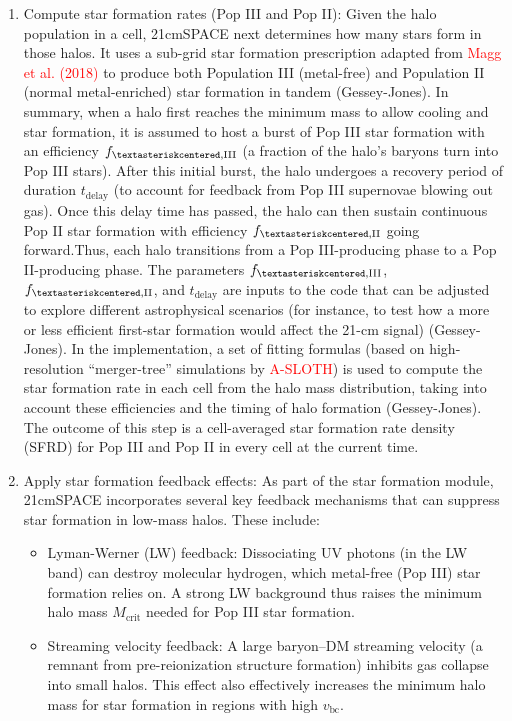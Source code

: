 \documentclass[floats,floatfix,showpacs,amssymb,prd,superscriptaddress,nofootinbib]{revtex4-2} %
\newcommand{\red}{\textcolor{red}}
\begin{document}
\begin{enumerate}
    \item Compute star formation rates (Pop III and Pop II): Given the halo population in a cell, 21cmSPACE next determines how many stars form in those halos. It uses a sub-grid star formation prescription adapted from \red{Magg et al. (2018)} to produce both Population III (metal-free) and Population II (normal metal-enriched) star formation in tandem (Gessey-Jones). In summary, when a halo first reaches the minimum mass to allow cooling and star formation, it is assumed to host a burst of Pop III star formation with an efficiency $f_{\textasteriskcentered,\text{III}}$ (a fraction of the halo’s baryons turn into Pop III stars). After this initial burst, the halo undergoes a recovery period of duration $t_{\text{delay}}$ (to account for feedback from Pop III supernovae blowing out gas). Once this delay time has passed, the halo can then sustain continuous Pop II star formation with efficiency $f_{\textasteriskcentered,\text{II}}$ going forward.Thus, each halo transitions from a Pop III-producing phase to a Pop II-producing phase. The parameters $f_{\textasteriskcentered,\text{III}}$, $f_{\textasteriskcentered,\text{II}}$, and $t_{\text{delay}}$ are inputs to the code that can be adjusted to explore different astrophysical scenarios (for instance, to test how a more or less efficient first-star formation would affect the 21-cm signal) (Gessey-Jones). In the implementation, a set of fitting formulas (based on high-resolution “merger-tree” simulations by \red{A-SLOTH}) is used to compute the star formation rate in each cell from the halo mass distribution, taking into account these efficiencies and the timing of halo formation (Gessey-Jones). The outcome of this step is a cell-averaged star formation rate density (SFRD) for Pop III and Pop II in every cell at the current time.

    \item Apply star formation feedback effects: As part of the star formation module, 21cmSPACE incorporates several key feedback mechanisms that can suppress star formation in low-mass halos. These include:
    \begin{itemize}
        \item Lyman-Werner (LW) feedback: Dissociating UV photons (in the LW band) can destroy molecular hydrogen, which metal-free (Pop III) star formation relies on. A strong LW background thus raises the minimum halo mass $M_{\text{crit}}$ needed for Pop III star formation.

        \item Streaming velocity feedback: A large baryon–DM streaming velocity (a remnant from pre-reionization structure formation) inhibits gas collapse into small halos. This effect also effectively increases the minimum halo mass for star formation in regions with high $v_{\text{bc}}$.


\end{itemize}
\end{enumerate}
\end{document}
